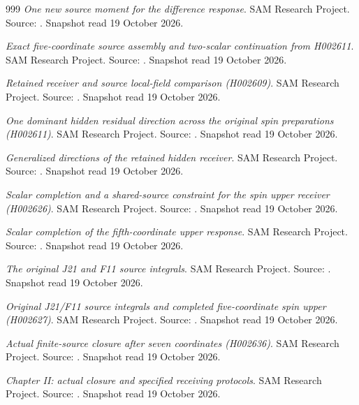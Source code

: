 \begin{thebibliography}{999}
 \emph{One new source moment for the difference response}. SAM Research Project. Source: . Snapshot read 19 October 2026.

 \emph{Exact five-coordinate source assembly and two-scalar continuation from H002611}. SAM Research Project. Source: . Snapshot read 19 October 2026.

 \emph{Retained receiver and source local-field comparison (H002609)}. SAM Research Project. Source: . Snapshot read 19 October 2026.

 \emph{One dominant hidden residual direction across the original spin preparations (H002611)}. SAM Research Project. Source: . Snapshot read 19 October 2026.

 \emph{Generalized directions of the retained hidden receiver}. SAM Research Project. Source: . Snapshot read 19 October 2026.

 \emph{Scalar completion and a shared-source constraint for the spin upper receiver (H002626)}. SAM Research Project. Source: . Snapshot read 19 October 2026.

 \emph{Scalar completion of the fifth-coordinate upper response}. SAM Research Project. Source: . Snapshot read 19 October 2026.

 \emph{The original J21 and F11 source integrals}. SAM Research Project. Source: . Snapshot read 19 October 2026.

 \emph{Original J21/F11 source integrals and completed five-coordinate spin upper (H002627)}. SAM Research Project. Source: . Snapshot read 19 October 2026.

 \emph{Actual finite-source closure after seven coordinates (H002636)}. SAM Research Project. Source: . Snapshot read 19 October 2026.

 \emph{Chapter II: actual closure and specified receiving protocols}. SAM Research Project. Source: . Snapshot read 19 October 2026.


\end{thebibliography}
